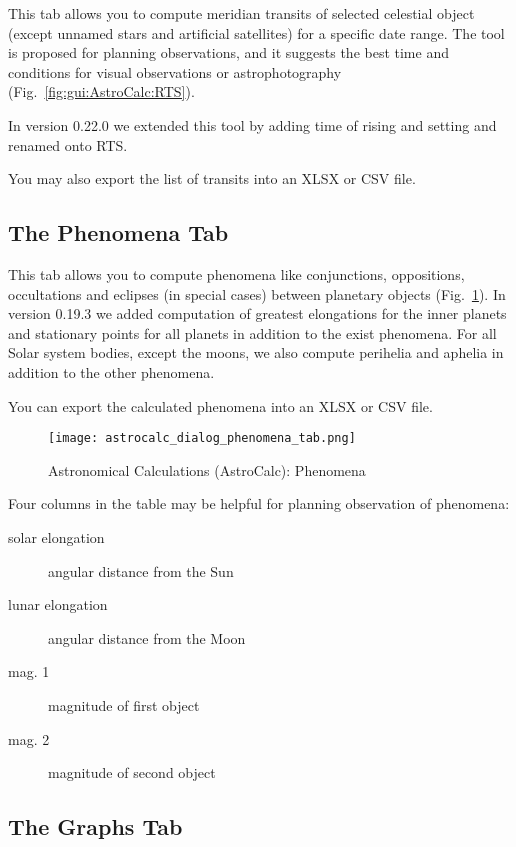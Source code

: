 \noindent This  tab allows you to compute meridian transits of selected celestial object 
(except unnamed stars and artificial satellites) for a specific date range. 
The tool is proposed for planning observations, and it suggests the best time and conditions 
for visual observations or astrophotography (Fig.~\ref{fig:gui:AstroCalc:RTS}). 

In version 0.22.0 we extended this tool by adding time of rising and setting and renamed onto RTS.

You may also export the list of transits into an XLSX or CSV file.

\subsection{The Phenomena Tab}
\label{sec:gui:AstroCalc:Phenomena}

This tab allows you to compute phenomena like conjunctions, oppositions, 
occultations and eclipses (in special cases) between planetary objects 
(Fig.~\ref{fig:gui:AstroCalc:Phenomena}). 
In version 0.19.3 we added computation of greatest 
elongations for the inner planets and stationary points for all planets in
addition to the exist phenomena. For all Solar system bodies, except the moons, 
we also compute perihelia and aphelia in addition to the other phenomena.

You can export the calculated phenomena into an XLSX or CSV file.

\begin{figure}[tbp]
\centering\texttt{[image: astrocalc\_dialog\_phenomena\_tab.png]}
\caption{Astronomical Calculations (AstroCalc): Phenomena}
\label{fig:gui:AstroCalc:Phenomena}
\end{figure}

Four columns in the table may be helpful for planning observation of phenomena:
\begin{description}
  \item[solar elongation] angular distance from the Sun
  \item[lunar elongation] angular distance from the Moon
  \item[mag. 1] magnitude of first object
  \item[mag. 2] magnitude of second object
\end{description}


\subsection{The Graphs Tab}
\label{sec:gui:AstroCalc:Graphs}


